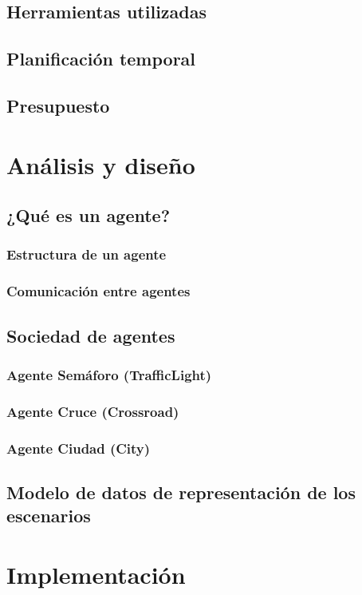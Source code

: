 \section{Herramientas utilizadas}
\section{Planificación temporal}
\section{Presupuesto}

\chapter{Análisis y diseño}
\section{¿Qué es un agente?}
\subsection{Estructura de un agente}
\subsection{Comunicación entre agentes}

\section{Sociedad de agentes}
\subsection{Agente Semáforo (TrafficLight)}
\subsection{Agente Cruce (Crossroad)}
\subsection{Agente Ciudad (City)}

\section{Modelo de datos de representación de los escenarios}

\chapter{Implementación}

